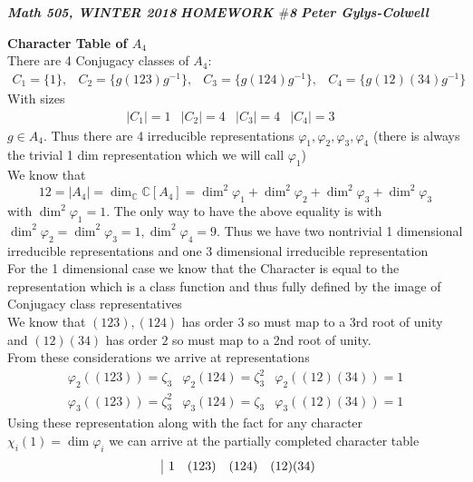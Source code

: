 \documentclass[12pt]{article}
\newenvironment{ques}[1]{\textbf{#1}\vspace{1 mm}\\ }{\bigskip}
\theoremstyle{definition}
\newcommand{\C}{\mathbb C}
\newcommand{\vp}{\varphi}
\begin{document}
\noindent \textit{\textbf{Math 505, WINTER 2018}} \hspace{1.3cm}
\textit{\textbf{HOMEWORK $\#$8}} \hspace{1.3cm} \textit{\textbf{Peter
Gylys-Colwell}} 

\vspace{1cm}

\begin{ques}{Character Table of $A_4$}
	There are 4 Conjugacy classes of $A_4$:
	$$
	\begin{matrix}
	C_1 = \{1\}, &
	C_2 = \{g(123)g^{-1}\}, &
	C_3 = \{g(124)g^{-1}\}, &
	C_4 = \{g(12)(34)g^{-1}\} &
	\end{matrix}
	$$
	With sizes
	$$
	\begin{matrix}
	|C_1| = 1 &
	|C_2| = 4 &
	|C_3| = 4 &
	|C_4| = 3 &
	\end{matrix}
	$$
	$g \in A_4$. Thus there are 4 irreducible representations $\vp_1, \vp_2, \vp_3,
	\vp_4$ (there is always the trivial 1 dim representation which we will call
	$\vp_1$) \\
	We know that 
	$$12 = |A_4| = \dim_\C \C[A_4] = \dim^2 \vp_1 + \dim^2 \vp_2 + \dim^2 \vp_3
	+ \dim^2 \vp_3$$
	with $\dim^2 \vp_1 = 1$. The only way to have the above equality is with
	$\dim^2 \vp_2 = \dim^2 \vp_3 = 1, \dim^2 \vp_4 = 9$. Thus we have two
	nontrivial 1 dimensional irreducible representations and one 3 dimensional
	irreducible representation\\
	For the 1 dimensional case we know that the Character is equal to the
	representation which is a class function and thus fully defined by the
	image of Conjugacy class representatives
	\\
	We know that $(123), (124)$ has order $3$ so must map to a 3rd root of
	unity and $(12)(34)$ has order $2$ so must map to a 2nd root of unity.
	\\
	From these considerations we arrive at representations
	$$\begin{matrix}
	\vp_2((123)) = \zeta_3 & \vp_2(124) = \zeta_3^2 & \vp_2((12)(34)) = 1
	\end{matrix}$$
	$$
	\begin{matrix}
	\vp_3((123)) = \zeta^2_3 & \vp_3(124) = \zeta_3 & \vp_3((12)(34)) = 1
	\end{matrix}$$
	Using these representation along with the fact for any character $\chi_i(1)
	= \dim \vp_i$ we can arrive at the partially completed character table
	$$
	\begin{array}{c| c c c c}
	 & 1  & (123) & (124) & (12)(34) \\

\end{array}$$
\end{ques}
\end{document}
